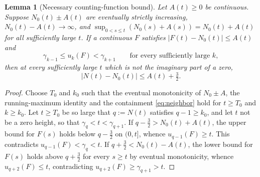 \documentclass[11pt,a4paper]{article}
\numberwithin{equation}{section}
\newtheorem{lemma}[theorem]{Lemma}
\theoremstyle{definition}
\theoremstyle{remark}
\begin{document}
\begin{lemma}[Necessary counting-function bound]\label{lem:countconstraint}
Let $A(t)\ge0$ be continuous. Suppose $N_0(t)\pm A(t)$ are eventually strictly increasing,
$N_0(t)-A(t)\to\infty$, and
$\sup_{0<s\le t}(N_0(s)+A(s))=N_0(t)+A(t)$ for all sufficiently large $t$.
If a continuous $F$ satisfies $|F(t)-N_0(t)|\le A(t)$ and
\begin{equation}\label{eq:neighbor}
\gamma_{k-1}\le u_k(F)<\gamma_{k+1}\qquad\text{for every sufficiently large }k,
\end{equation}
then at every sufficiently large $t$ which is not the imaginary part of a zero,
\begin{equation}\label{eq:countnecessary}
|N(t)-N_0(t)|\le A(t)+\tfrac32.
\end{equation}
\end{lemma}
\begin{proof}
Choose $T_0$ and $k_0$ such that the eventual monotonicity of $N_0\pm A$, the running-maximum identity and the containment \eqref{eq:neighbor} hold for $t\ge T_0$ and $k\ge k_0$. Let $t\ge T_0$ be so large that $q:=N(t)$ satisfies $q-1\ge k_0$, and let $t$ not be a zero height, so that $\gamma_q<t<\gamma_{q+1}$. If
$q-\frac32>N_0(t)+A(t)$, the upper bound for $F(s)$ holds below $q-\frac32$ on $(0,t]$, whence $u_{q-1}(F)\ge t$. This contradicts $u_{q-1}(F)<\gamma_q<t$. If $q+\frac32<N_0(t)-A(t)$, the lower bound for $F(s)$ holds above $q+\frac32$ for every $s\ge t$ by eventual monotonicity, whence $u_{q+2}(F)\le t$, contradicting $u_{q+2}(F)\ge\gamma_{q+1}>t$.
\end{proof}
\end{document}
